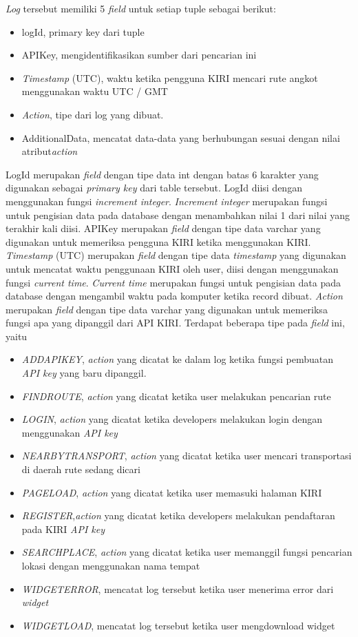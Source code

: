 \textsl{Log} tersebut memiliki 5 \textsl{field} untuk setiap tuple sebagai berikut:
\begin{itemize}
	\item logId, primary key dari tuple
	\item APIKey, mengidentifikasikan sumber dari pencarian ini
	\item \textsl{Timestamp} (UTC), waktu ketika pengguna KIRI mencari rute angkot menggunakan waktu UTC / GMT
	\item \textsl{Action}, tipe dari log yang dibuat.
	\item AdditionalData, mencatat data-data yang berhubungan sesuai dengan nilai atribut\textsl{action}
\end{itemize}

LogId merupakan \textsl{field} dengan tipe data int dengan batas 6 karakter yang digunakan sebagai \textsl{primary key} dari table tersebut. LogId diisi dengan menggunakan fungsi \textsl{increment integer}. \textsl{Increment integer} merupakan fungsi untuk pengisian data pada database dengan menambahkan nilai 1 dari nilai yang terakhir kali diisi.
APIKey merupakan \textsl{field} dengan tipe data varchar yang digunakan untuk memeriksa pengguna KIRI ketika menggunakan KIRI.
\textsl{Timestamp} (UTC) merupakan \textsl{field} dengan tipe data \textsl{timestamp} yang digunakan untuk mencatat waktu penggunaan KIRI oleh user, diisi dengan menggunakan fungsi \textsl{current time}. \textsl{Current time} merupakan fungsi untuk pengisian data pada database dengan mengambil waktu pada komputer ketika record dibuat.
\textsl{Action} merupakan \textsl{field} dengan tipe data varchar yang digunakan untuk memeriksa fungsi apa yang dipanggil dari API KIRI. Terdapat beberapa tipe pada \textsl{field} ini, yaitu
\begin{itemize}
	\item \textsl{ADDAPIKEY}, \textsl{action} yang dicatat ke dalam log ketika fungsi pembuatan \textsl{API key} yang baru dipanggil.
	\item \textsl{FINDROUTE}, \textsl{action} yang dicatat ketika user melakukan pencarian rute
	\item \textsl{LOGIN}, \textsl{action} yang dicatat ketika developers melakukan login dengan menggunakan \textsl{API key}
	\item \textsl{NEARBYTRANSPORT}, \textsl{action} yang dicatat ketika user mencari transportasi di daerah rute sedang dicari
	\item \textsl{PAGELOAD}, \textsl{action} yang dicatat ketika user memasuki halaman KIRI
 	\item \textsl{REGISTER},\textsl{action} yang dicatat ketika developers melakukan pendaftaran pada KIRI \textsl{API key}
	\item \textsl{SEARCHPLACE}, \textsl{action} yang dicatat ketika user memanggil fungsi pencarian lokasi dengan menggunakan nama tempat
	\item \textsl{WIDGETERROR}, mencatat log tersebut ketika user menerima error dari \textit{widget}
	\item \textsl{WIDGETLOAD}, mencatat log tersebut ketika user mengdownload widget
\end{itemize}
